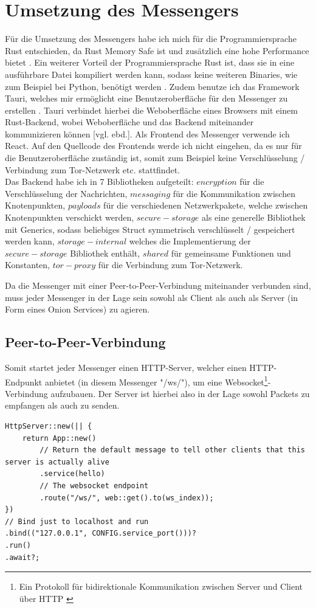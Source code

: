 \documentclass[a4paper,ngerman, headheight=28pt,12pt]{scrartcl}
\newcommand{\vcite}[1]{\cite[vgl.][]{#1}}
\newcommand{\vebd}{[vgl. ebd.]}
\begin{document}
\section{Umsetzung des Messengers}
Für die Umsetzung des Messengers habe ich mich für die Programmiersprache Rust entschieden, da Rust Memory Safe ist und zusätzlich eine hohe Performance bietet \vcite{RustSecurity}. Ein weiterer Vorteil der Programmiersprache Rust ist, dass sie in eine ausführbare Datei kompiliert werden kann, sodass keine weiteren Binaries, wie zum Beispiel bei Python, benötigt werden \vcite{RustCompile}. Zudem benutze ich das Framework Tauri, welches mir ermöglicht eine Benutzeroberfläche für den Messenger zu erstellen \vcite{RustTauri}. Tauri verbindet hierbei die Weboberfläche eines Browsers mit einem Rust-Backend, wobei Weboberfläche und das Backend miteinander kommunizieren können \vebd. Als Frontend des Messenger verwende ich React. Auf den Quellcode des Frontends werde ich nicht eingehen, da es nur für die Benutzeroberfläche zuständig ist, somit zum Beispiel keine Verschlüsselung / Verbindung zum Tor-Netzwerk etc. stattfindet. \\
Das Backend habe ich in 7 Bibliotheken aufgeteilt: $encryption$ für die Verschlüsselung der Nachrichten, $messaging$ für die Kommunikation zwischen Knotenpunkten, $payloads$ für die verschiedenen Netzwerkpakete, welche zwischen Knotenpunkten verschickt werden, $secure-storage$ als eine generelle Bibliothek mit Generics, sodass beliebiges Struct symmetrisch verschlüsselt / gespeichert werden kann, $storage-internal$ welches die Implementierung der $secure-storage$ Bibliothek enthält, $shared$ für gemeinsame Funktionen und Konstanten, $tor-proxy$ für die Verbindung zum Tor-Netzwerk.

Da die Messenger mit einer Peer-to-Peer-Verbindung miteinander verbunden sind, muss jeder Messenger in der Lage sein sowohl als Client als auch als Server (in Form eines Onion Services) zu agieren.
\subsection{Peer-to-Peer-Verbindung}
Somit startet jeder Messenger einen HTTP-Server, welcher einen HTTP-Endpunkt anbietet (in diesem Messenger "/ws/"), um eine Websocket\footnote{%
Ein Protokoll für bidirektionale Kommunikation zwischen Server und Client über HTTP \vcite{WebsocketDef}}-Verbindung aufzubauen. Der Server ist hierbei also in der Lage sowohl Packets %
zu empfangen als auch zu senden.
\begin{verbatim}
HttpServer::new(|| {
    return App::new()
        // Return the default message to tell other clients that this server is actually alive
        .service(hello)
        // The websocket endpoint
        .route("/ws/", web::get().to(ws_index));
})
// Bind just to localhost and run
.bind(("127.0.0.1", CONFIG.service_port()))?
.run()
.await?;
\end{verbatim}
\end{document}

